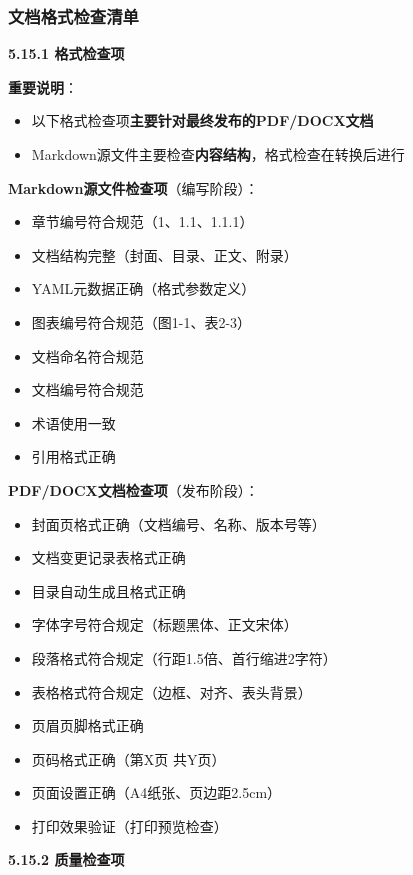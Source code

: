 \documentclass[12pt,a4paper]{article}
\numberwithin{equation}{section}  %
\begin{document}
\subsubsection{文档格式检查清单}
\textbf{5.15.1 格式检查项}

\textbf{重要说明}：
\begin{itemize}
\item [警告] 以下格式检查项\textbf{主要针对最终发布的PDF/DOCX文档}
\item [警告] Markdown源文件主要检查\textbf{内容结构}，格式检查在转换后进行
\end{itemize}

\textbf{Markdown源文件检查项}（编写阶段）：

\begin{itemize}
\item [ ] 章节编号符合规范（1、1.1、1.1.1）
\item [ ] 文档结构完整（封面、目录、正文、附录）
\item [ ] YAML元数据正确（格式参数定义）
\item [ ] 图表编号符合规范（图1-1、表2-3）
\item [ ] 文档命名符合规范
\item [ ] 文档编号符合规范
\item [ ] 术语使用一致
\item [ ] 引用格式正确
\end{itemize}

\textbf{PDF/DOCX文档检查项}（发布阶段）：

\begin{itemize}
\item [ ] 封面页格式正确（文档编号、名称、版本号等）
\item [ ] 文档变更记录表格式正确
\item [ ] 目录自动生成且格式正确
\item [ ] 字体字号符合规定（标题黑体、正文宋体）
\item [ ] 段落格式符合规定（行距1.5倍、首行缩进2字符）
\item [ ] 表格格式符合规定（边框、对齐、表头背景）
\item [ ] 页眉页脚格式正确
\item [ ] 页码格式正确（第X页 共Y页）
\item [ ] 页面设置正确（A4纸张、页边距2.5cm）
\item [ ] 打印效果验证（打印预览检查）
\end{itemize}

\textbf{5.15.2 质量检查项}
\end{document}
